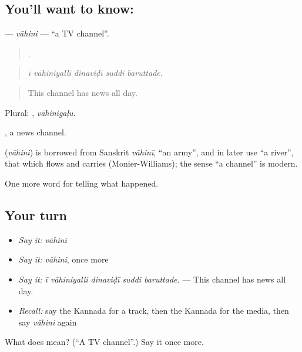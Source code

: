 \subsection*{You'll want to know: }
\textbf{} — \emph{vāhini} — \textquotedblleft{}a TV channel\textquotedblright{}.

\begin{quote}
    .
\end{quote}

\begin{quote}
\emph{ī vāhiniyalli dinaviḍī suddi baruttade.}
\end{quote}

\begin{quote}
This channel has news all day.
\end{quote}

Plural: , \emph{vāhinigaḷu}.

 , a news channel.

\begin{cousinweb}
\textbf{} (\emph{vāhini}) is borrowed from Sanskrit \emph{vāhinī}, \textquotedblleft{}an army\textquotedblright{}, and in later use \textquotedblleft{}a river\textquotedblright{}, that which flows and carries (Monier-Williams); the sense \textquotedblleft{}a channel\textquotedblright{} is modern.
\end{cousinweb}

\begin{grammarlens}[title={What you've built}]
One more word for telling what happened.
\end{grammarlens}

\subsection*{Your turn}
\begin{itemize}
\raggedright
  \item \emph{Say it:} \emph{vāhini}
  \item \emph{Say it:} \emph{vāhini}, once more
  \item \emph{Say it:} \emph{ī vāhiniyalli dinaviḍī suddi baruttade.} — This channel has news all day.
  \item \emph{Recall:} say the Kannada for a track, then the Kannada for the media, then say \emph{vāhini} again
\end{itemize}

\begin{tcolorbox}[breakable,colback=teal!4,colframe=teal!35!black,title={Before you move on}]
What does  mean? (\textquotedblleft{}A TV channel\textquotedblright{}.) Say it once more.
\end{tcolorbox}
